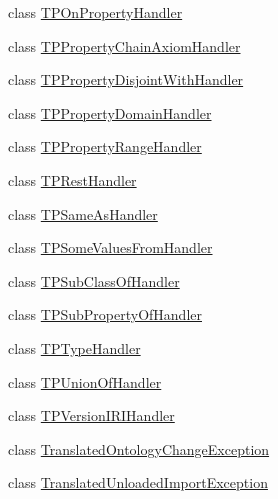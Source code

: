 \begin{DoxyCompactItemize}
class \hyperlink{classorg_1_1coode_1_1owlapi_1_1rdfxml_1_1parser_1_1_t_p_on_property_handler}{T\-P\-On\-Property\-Handler}
\item 
class \hyperlink{classorg_1_1coode_1_1owlapi_1_1rdfxml_1_1parser_1_1_t_p_property_chain_axiom_handler}{T\-P\-Property\-Chain\-Axiom\-Handler}
\item 
class \hyperlink{classorg_1_1coode_1_1owlapi_1_1rdfxml_1_1parser_1_1_t_p_property_disjoint_with_handler}{T\-P\-Property\-Disjoint\-With\-Handler}
\item 
class \hyperlink{classorg_1_1coode_1_1owlapi_1_1rdfxml_1_1parser_1_1_t_p_property_domain_handler}{T\-P\-Property\-Domain\-Handler}
\item 
class \hyperlink{classorg_1_1coode_1_1owlapi_1_1rdfxml_1_1parser_1_1_t_p_property_range_handler}{T\-P\-Property\-Range\-Handler}
\item 
class \hyperlink{classorg_1_1coode_1_1owlapi_1_1rdfxml_1_1parser_1_1_t_p_rest_handler}{T\-P\-Rest\-Handler}
\item 
class \hyperlink{classorg_1_1coode_1_1owlapi_1_1rdfxml_1_1parser_1_1_t_p_same_as_handler}{T\-P\-Same\-As\-Handler}
\item 
class \hyperlink{classorg_1_1coode_1_1owlapi_1_1rdfxml_1_1parser_1_1_t_p_some_values_from_handler}{T\-P\-Some\-Values\-From\-Handler}
\item 
class \hyperlink{classorg_1_1coode_1_1owlapi_1_1rdfxml_1_1parser_1_1_t_p_sub_class_of_handler}{T\-P\-Sub\-Class\-Of\-Handler}
\item 
class \hyperlink{classorg_1_1coode_1_1owlapi_1_1rdfxml_1_1parser_1_1_t_p_sub_property_of_handler}{T\-P\-Sub\-Property\-Of\-Handler}
\item 
class \hyperlink{classorg_1_1coode_1_1owlapi_1_1rdfxml_1_1parser_1_1_t_p_type_handler}{T\-P\-Type\-Handler}
\item 
class \hyperlink{classorg_1_1coode_1_1owlapi_1_1rdfxml_1_1parser_1_1_t_p_union_of_handler}{T\-P\-Union\-Of\-Handler}
\item 
class \hyperlink{classorg_1_1coode_1_1owlapi_1_1rdfxml_1_1parser_1_1_t_p_version_i_r_i_handler}{T\-P\-Version\-I\-R\-I\-Handler}
\item 
class \hyperlink{classorg_1_1coode_1_1owlapi_1_1rdfxml_1_1parser_1_1_translated_ontology_change_exception}{Translated\-Ontology\-Change\-Exception}
\item 
class \hyperlink{classorg_1_1coode_1_1owlapi_1_1rdfxml_1_1parser_1_1_translated_unloaded_import_exception}{Translated\-Unloaded\-Import\-Exception}
\item 

\end{DoxyCompactItemize}
